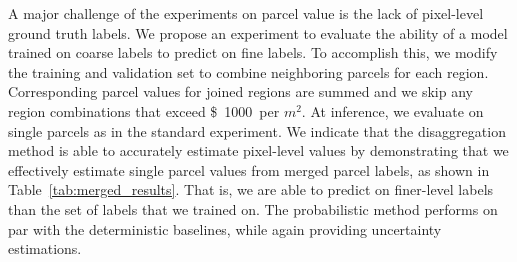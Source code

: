 \documentclass[10pt,twocolumn,a4paper]{article}
\begin{document}


A major challenge of the experiments on parcel value is the lack of pixel-level ground truth labels. We propose an experiment to evaluate the ability of a model trained on coarse labels to predict on fine labels. To accomplish this, we modify the training and validation set to combine neighboring parcels for each region. Corresponding parcel values for joined regions are summed and we skip any region combinations that exceed \SI{1000}[\$] per $m^2$. At inference, we evaluate on single parcels as in the standard experiment. 
We indicate that the disaggregation method is able to accurately estimate pixel-level values by demonstrating that we effectively estimate single parcel values from merged parcel labels, as shown in Table~\ref{tab:merged_results}. That is, we are able to predict on finer-level labels than the set of labels that we trained on. The probabilistic method performs on par with the deterministic baselines, while again providing uncertainty estimations.
    


    

\end{document}
